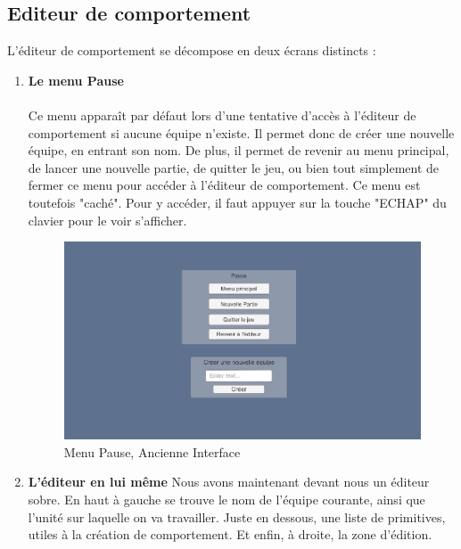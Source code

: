 \documentclass{report}
\begin{document}
\subsection{Editeur de comportement}
L'éditeur de comportement se décompose en deux écrans distincts  : 
\begin{enumerate}
\item\textbf{Le menu Pause}
\paragraph{}
Ce menu apparaît par défaut lors d'une tentative d'accès à l'éditeur de comportement si aucune équipe n'existe. Il permet donc de créer une nouvelle équipe, en entrant son nom.\newline
De plus, il permet de revenir au menu principal, de lancer une nouvelle partie, de quitter le jeu, ou bien tout simplement de fermer ce menu pour accéder à l'éditeur de comportement.\newline
Ce menu est toutefois "caché". Pour y accéder, il faut appuyer sur la touche "ECHAP" du clavier pour le voir s'afficher.
\clearpage
\begin{figure}[h]
	\centering
		\includegraphics[scale=0.50]{PauseMenuOld}
	\caption{Menu Pause, Ancienne Interface}
\end{figure}


\item\textbf{L'éditeur en lui même}\newline
Nous avons maintenant devant nous un éditeur sobre. En haut à gauche se trouve le nom de l'équipe courante, ainsi que l’unité sur laquelle on va travailler.\newline
Juste en dessous, une liste de primitives, utiles à la création de comportement.\newline
Et enfin, à droite, la zone d'édition.


\end{enumerate}
\end{document}
